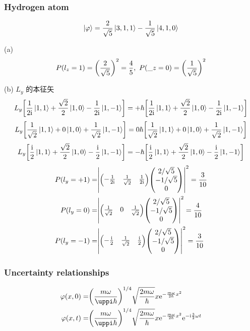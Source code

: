 \subsubsection{Hydrogen atom}

\[
    \ket{\varphi} = \frac{2}{\sqrt{5}} \ket{3, 1, 1} - \frac{1}{\sqrt{5}} \ket{4, 1, 0}
\]

(a)
\[
    P(l_z = 1) = \qty(\frac{2}{\sqrt{5}})^2 = \frac{4}{5},\ P(\_z = 0) = \qty(\frac{1}{\sqrt{5}})^2
\]


(b)
$L_y$ 的本征矢 \[
    L_y \qty[\frac{1}{2 \mathrm{i}} \ket{1, 1} + \frac{\sqrt{2}}{2} \ket{1, 0} - \frac{1}{2 \mathrm{i}} \ket{1, -1}] = + \hbar \qty[\frac{1}{2 \mathrm{i}} \ket{1, 1} + \frac{\sqrt{2}}{2} \ket{1, 0} - \frac{1}{2 \mathrm{i}} \ket{1, -1}]
\] \[
    L_y \qty[\frac{1}{\sqrt{2}} \ket{1, 1} + 0 \ket{1, 0} + \frac{1}{\sqrt{2}} \ket{1, -1}] = 0 \hbar \qty[\frac{1}{\sqrt{2}} \ket{1, 1} + 0 \ket{1, 0} + \frac{1}{\sqrt{2}} \ket{1, -1}]
\] \[
    L_y \qty[\frac{\mathrm{i}}{2} \ket{1, 1} + \frac{\sqrt{2}}{2} \ket{1, 0} - \frac{\mathrm{i}}{2} \ket{1, -1}] = - \hbar \qty[\frac{\mathrm{i}}{2} \ket{1, 1} + \frac{\sqrt{2}}{2} \ket{1, 0} - \frac{\mathrm{i}}{2} \ket{1, -1}]
\] \begin{align*}
    P(l_y = + 1) = & \qty|\mqty(- \frac{1}{2 \rmi} & \frac{1}{\sqrt{2}} & \frac{1}{2 \rmi}) \mqty(2 / \sqrt{5}   \\ - 1 /\sqrt{5} \\ 0)|^2 = \frac{3}{10}\\
    P(l_y = 0) =   & \qty|\mqty(\frac{1}{\sqrt{2}} & 0                  & \frac{1}{\sqrt{2}}) \mqty(2 / \sqrt{5} \\ - 1 /\sqrt{5} \\ 0)|^2 = \frac{4}{10}\\
    P(l_y = - 1) = & \qty|\mqty(- \frac{\rmi}{2}   & \frac{1}{\sqrt{2}} & \frac{\rmi}{2}) \mqty(2 / \sqrt{5}     \\ - 1 /\sqrt{5} \\ 0)|^2 = \frac{3}{10}
\end{align*}

\subsubsection{Uncertainty relationships}

\begin{align*}
    \varphi(x, 0) = & \qty(\frac{m \omega}{\uppi \hbar})^{1 / 4} \sqrt{\frac{2 m \omega}{\hbar}} x \rme^{- \frac{m \omega}{2 \hbar} x^2}                                    \\
    \varphi(x, t) = & \qty(\frac{m \omega}{\uppi \hbar})^{1 / 4} \sqrt{\frac{2 m \omega}{\hbar}} x \rme^{- \frac{m \omega}{2 \hbar} x^2} \rme^{- \rmi \frac{3}{2} \omega t}
\end{align*}

